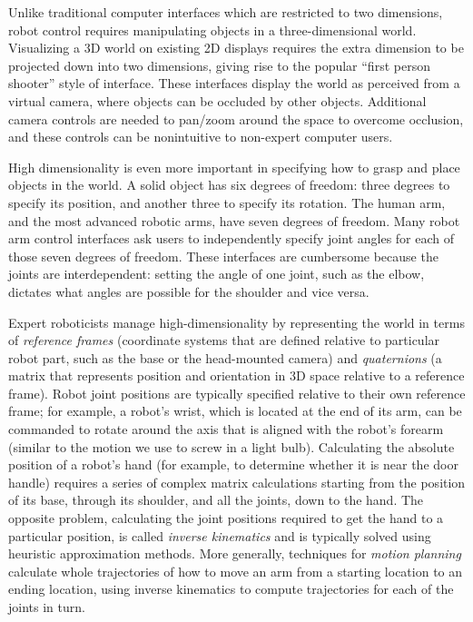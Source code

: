 \documentclass{article}
\begin{document}

Unlike traditional computer interfaces which are restricted to two dimensions, robot control requires manipulating objects in a three-dimensional world. Visualizing a 3D world on existing 2D displays requires the extra dimension to be projected down into two dimensions, giving rise to the popular ``first person shooter'' style of interface. These interfaces display the world as perceived from a virtual camera, where objects can be occluded by other objects. Additional camera controls are needed to pan/zoom around the space to overcome occlusion, and these controls can be nonintuitive to non-expert computer users.

High dimensionality is even more important in specifying how to grasp and place objects in the world. A solid object has six degrees of freedom: three degrees to specify its position, and another three to specify its rotation. The human arm, and the most advanced robotic arms, have seven degrees of freedom.  Many robot arm control interfaces ask users to independently specify joint angles for each of those seven degrees of freedom. These interfaces are cumbersome because the joints are interdependent: setting the angle of one joint, such as the elbow, dictates what angles are possible for the shoulder and vice versa.

Expert roboticists manage high-dimensionality by representing the world in terms of {\em reference frames} (coordinate systems that are defined relative to particular robot part, such as the base or the head-mounted camera) and {\em quaternions} (a matrix that represents position and orientation in 3D space relative to a reference frame). Robot joint positions are typically specified relative to their own reference frame; for example, a robot's wrist, which is located at the end of its arm, can be commanded to rotate around the axis that is aligned with the robot's forearm (similar to the motion we use to screw in a light bulb). Calculating the absolute position of a robot's hand (for example, to determine whether it is near the door handle) requires a series of complex matrix calculations starting from the position of its base, through its shoulder, and all the joints, down to the hand. The opposite problem, calculating the joint positions required to get the hand to a particular position, is called {\em inverse kinematics} and is typically solved using heuristic approximation methods. More generally, techniques for {\em motion planning} calculate whole trajectories of how to move an arm from a starting location to an ending location, using inverse kinematics to compute trajectories for each of the joints in turn.
\end{document}
